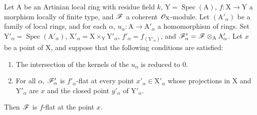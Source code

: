 \begin{proposition}[11.4.12]
\label{IV.11.4.12}
Let $\mathrm{A}$ be an Artinian local ring with residue field $k$,
$\mathrm{Y}=\operatorname{Spec}(\mathrm{A})$, $f:\mathrm{X}\to\mathrm{Y}$ a morphism locally of finite type, and $\mathscr{F}$ a coherent $\mathscr{O}_\mathrm{X}$-module.
Let $(\mathrm{A}'_\alpha)$ be a family of local rings, and for each $\alpha$, $u_\alpha:\mathrm{A}\to\mathrm{A}'_\alpha$ a homomorphism
of rings. Set $\mathrm{Y}'_\alpha=\operatorname{Spec}(\mathrm{A}'_\alpha)$, $\mathrm{X}'_\alpha=\mathrm{X}\times_\mathrm{Y}\mathrm{Y}'_\alpha$,
$f'_\alpha=f_{(\mathrm{Y}'_\alpha)}$, and $\mathscr{F}'_\alpha=\mathscr{F}\otimes_\mathrm{A}\mathrm{A}'_\alpha$. Let $x$ be a point
of $\mathrm{X}$, and suppose that the following conditions are satisfied:
\begin{enumerate}[label=\textup{(\roman*)}]
  \item The intersection of the kernels of the $u_\alpha$ is reduced to $0$.
  \item For all $\alpha$, $\mathscr{F}'_\alpha$ is $f'_\alpha$-flat at \textup{every} point $x'_\alpha\in\mathrm{X}'_\alpha$ whose projections in $\mathrm{X}$ and $\mathrm{Y}'_\alpha$
  are $x$ and the closed point $y'_\alpha$ of $\mathrm{Y}'_\alpha$.
\end{enumerate}

Then $\mathscr{F}$ is $f$-flat at the point $x$.
\end{proposition}

